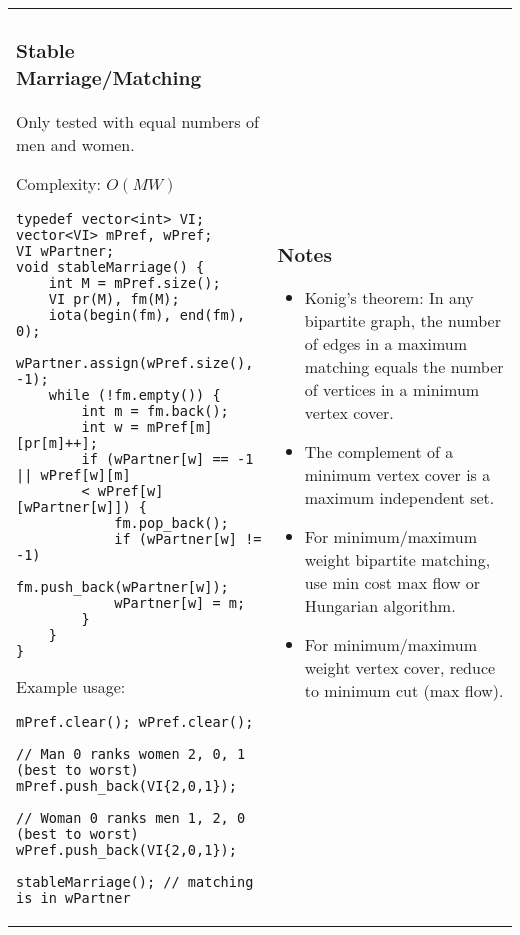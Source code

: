 \documentclass[letterpaper]{article}
\begin{document}
\vspace{-3em}
\begin{tabular}{@{}p{9cm}p{9cm}@{}}
    \subsubsection{Stable Marriage/Matching}

    Only tested with equal numbers of men and women.

    Complexity: $O\left(MW\right)$

    \begin{lstlisting}
typedef vector<int> VI;
vector<VI> mPref, wPref;
VI wPartner;
void stableMarriage() {
	int M = mPref.size();
	VI pr(M), fm(M);
	iota(begin(fm), end(fm), 0);
	wPartner.assign(wPref.size(), -1);
	while (!fm.empty()) {
		int m = fm.back();
		int w = mPref[m][pr[m]++];
		if (wPartner[w] == -1 || wPref[w][m]
		< wPref[w][wPartner[w]]) {
			fm.pop_back();
			if (wPartner[w] != -1)
				fm.push_back(wPartner[w]);
			wPartner[w] = m;
		}
	}
}
\end{lstlisting}

    Example usage:
    \begin{lstlisting}
mPref.clear(); wPref.clear();

// Man 0 ranks women 2, 0, 1 (best to worst)
mPref.push_back(VI{2,0,1});

// Woman 0 ranks men 1, 2, 0 (best to worst)
wPref.push_back(VI{2,0,1});

stableMarriage(); // matching is in wPartner
\end{lstlisting}
     &
    \subsubsection{Notes}
    \begin{itemize}
        \item Konig's theorem: In any bipartite graph, the number of edges in a maximum matching equals the number of vertices in a minimum vertex cover.
        \item The complement of a minimum vertex cover is a maximum independent set.
        \item For minimum/maximum weight bipartite matching, use min cost max flow or Hungarian algorithm.
        \item For minimum/maximum weight vertex cover, reduce to minimum cut (max flow).
    \end{itemize}
\end{tabular}
\end{document}
